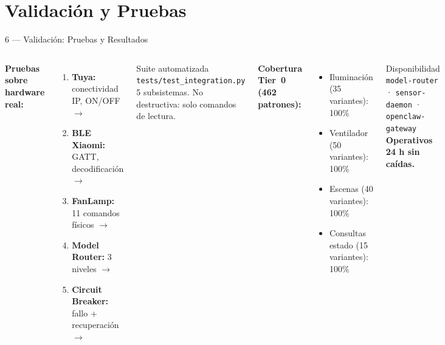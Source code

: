 \section{Validación y Pruebas}

\begin{frame}{6 — Validación: Pruebas y Resultados}
  \hypertarget{s:validacion}{}
  \begin{columns}[T]
    \footnotesize
    \textbf{Pruebas sobre hardware real:}
    \begin{enumerate}
      \item \textbf{Tuya:} conectividad IP, ON/OFF $\rightarrow$ \checkmark
      \item \textbf{BLE Xiaomi:} GATT, decodificación $\rightarrow$ \checkmark
      \item \textbf{FanLamp:} 11 comandos físicos $\rightarrow$ \checkmark
      \item \textbf{Model Router:} 3 niveles $\rightarrow$ \checkmark
      \item \textbf{Circuit Breaker:} fallo + recuperación $\rightarrow$ \checkmark
    \end{enumerate}

    \begin{exampleblock}{Suite automatizada}
      \footnotesize
      \texttt{tests/test\_integration.py}\\
      5 subsistemas. No destructiva: solo comandos de lectura.
    \end{exampleblock}

    \footnotesize
    \textbf{Cobertura Tier~0 (462 patrones):}
    \begin{itemize}
      \item Iluminación (35 variantes): 100\%
      \item Ventilador (50 variantes): 100\%
      \item Escenas (40 variantes): 100\%
      \item Consultas estado (15 variantes): 100\%
    \end{itemize}

    \begin{block}{Disponibilidad}
      \footnotesize\centering
      \texttt{model-router} · \texttt{sensor-daemon} · \texttt{openclaw-gateway}\\[0.1cm]
      \textbf{Operativos 24 h sin caídas.}
    \end{block}
  \end{columns}
\end{frame}
